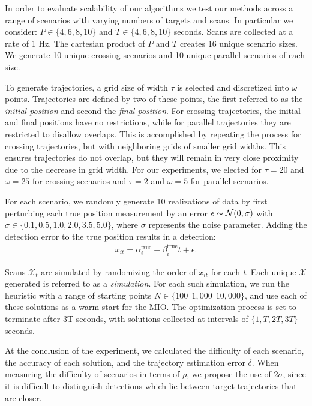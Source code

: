 In order to evaluate scalability of our algorithms we test our methods across a range of scenarios with varying numbers of targets and scans. In particular we consider: $ P \in \{4,6,8,10\}$ and $T \in \{4,6,8,10\}$ seconds. Scans are collected at a rate of 1 Hz. The cartesian product of $P$ and $T$ creates 16 unique scenario sizes. We generate 10 unique crossing scenarios and 10 unique parallel scenarios of each size. 

To generate trajectories, a grid size of width $\tau$ is selected and discretized into $\omega$ points. Trajectories are defined by two of these points, the first referred to as the \textit{initial position} and second the \textit{final position}. For crossing trajectories, the initial and final positions have no restrictions, while for parallel trajectories they are restricted to disallow overlaps. This is accomplished by repeating the process for crossing trajectories, but with neighboring grids of smaller grid widths. This ensures trajectories do not overlap, but they will remain in very close proximity due to the decrease in grid width. For our experiments, we elected for $\tau = 20$ and $\omega = 25$ for crossing scenarios and $\tau = 2$ and $\omega = 5$ for parallel scenarios. 

For each scenario, we randomly generate 10 realizations of data by first perturbing each true position measurement by an error $\epsilon \thicksim \mathcal{N}(0,\sigma)$ with $\sigma \in \{0.1,0.5,1.0,2.0,3.5,5.0\}$, where $\sigma$ represents the noise parameter. Adding the detection error to the true position results in a detection:
\begin{align*}
	x_{it} = \alpha^{\text{true}}_{i} + \beta^{\text{true}}_{i}t+\epsilon.
\end{align*}

Scans $\mathcal{X}_{t}$ are simulated by randomizing the order of $x_{it}$ for each \textit{t}. Each unique $\boldsymbol{\mathcal{X}}$ generated is referred to as a \textit{simulation}. For each such simulation, we run the heuristic with a range of starting points $N \in \{100\ \ 1,000\ \ 10,000\}$, and use each of these solutions as a warm start for the MIO. The optimization process is set to terminate after 3T seconds, with solutions collected at intervals of $\{1,T,2T,3T\}$ seconds.

At the conclusion of the experiment, we calculated the difficulty of each scenario, the accuracy of each solution, and the trajectory estimation error $\delta$. When measuring the difficulty of scenarios in terms of $\rho$, we propose the use of $2\sigma$, since it is difficult to distinguish detections which lie between target trajectories that are closer.

